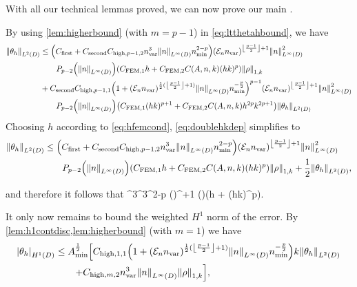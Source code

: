 \epf
With all our technical lemmas proved, we can now prove our main .

By using \cref{lem:higherbound} (with $m=p-1$) in \cref{eq:ltthetahbound}, we have
\begin{align}
\NLtD{\thetah}&\leq \mleft(\Cfirst + \Csecond\Chighfn{p-1,2} \nvar^3\NLiD{n}\nmin^{2-p} \mright)\mleft(\En \nvar\mright)^{\floor{\frac{p-1}2}+1}\NLiD{n}^2\nonumber\\
&\quad\quad\Pfn{p-2}\mleft(\NLiD{n}\mright)\mleft(\CFEMotilde h + \CFEMttilde \CAnk (hk)^p\mright)\NW{\rho}\nonumber\\
&+\Csecond  \Chighfn{p-1,1} \mleft(1+\mleft(\En\nvar\mright)^{\half(\floor{\frac{p-1}2}+1)}\NLiD{n}\nmin^{-\frac{p}2}\mright)^{p-1}\mleft(\En \nvar\mright)^{\floor{\frac{p-1}2}+1}\NLiD{n}^2\nonumber\\
&\quad\quad\Pfn{p-2}\mleft(\NLiD{n}\mright)\mleft(\CFEMotilde (hk )^{p+1}+ \CFEMttilde \CAnk h^{2p}k^{2p+1}\mright)\NLtD{\thetah}\label{eq:doublehkdep}
\end{align}
Choosing $h$ according to \cref{eq:hfemcond}, \cref{eq:doublehkdep} simplifies to
\begin{align*}
\NLtD{\thetah} &\leq \mleft(\Cfirst + \Csecond\Chighfn{p-1,2} \nvar^3\NLiD{n}\nmin^{2-p} \mright)\mleft(\En \nvar\mright)^{\floor{\frac{p-1}2}+1}\NLiD{n}^2\\
&\quad\quad\Pfn{p-2}\mleft(\NLiD{n}\mright)\mleft(\CFEMotilde h + \CFEMttilde \CAnk (hk)^p\mright)\NW{\rho} + \half \NLtD{\thetah},
\end{align*}

and therefore it follows that
\beq\label{eq:ltboundwithrho}
\NLtD{\thetah} \leq \nvar^3^3\nmin^{2-p} \mleft(\En \nvar\mright)^{+1} \mleft(\mright)\mleft(\CLtboundo h + \CLtboundt  \CAnk (hk)^p\mright)\NW{\rho}.
\eeq

It only now remains to bound the weighted $H^1$ norm of the error. By \cref{lem:h1contdisc,lem:higherbound} (with $m=1$) we have
\begin{align}
\SNHoD{\thetah} &\leq \Amin^{\half} \mleft[\Chighfn{1,1} \mleft(1+\mleft(\En\nvar\mright)^{\half(\floor{\frac{p-1}2}+1)}\NLiD{n}\nmin^{-\frac{p}2}\mright)k \NLtD{\thetah}\mright.\nonumber\\
&\mleft.\quad\quad+ \Chighmt \nvar^3\NLiD{n} \NW{\rho}\mright],\label{eq:sntheta}
\end{align}

